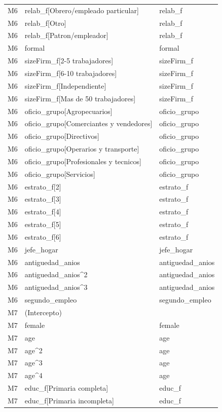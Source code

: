 \begin{longtable}{lll}
M6 & relab\_f[Obrero/empleado particular] & relab\_f \\
M6 & relab\_f[Otro] & relab\_f \\
M6 & relab\_f[Patron/empleador] & relab\_f \\
M6 & formal & formal \\
M6 & sizeFirm\_f[2-5 trabajadores] & sizeFirm\_f \\
M6 & sizeFirm\_f[6-10 trabajadores] & sizeFirm\_f \\
M6 & sizeFirm\_f[Independiente] & sizeFirm\_f \\
M6 & sizeFirm\_f[Mas de 50 trabajadores] & sizeFirm\_f \\
M6 & oficio\_grupo[Agropecuarios] & oficio\_grupo \\
M6 & oficio\_grupo[Comerciantes y vendedores] & oficio\_grupo \\
M6 & oficio\_grupo[Directivos] & oficio\_grupo \\
M6 & oficio\_grupo[Operarios y transporte] & oficio\_grupo \\
M6 & oficio\_grupo[Profesionales y tecnicos] & oficio\_grupo \\
M6 & oficio\_grupo[Servicios] & oficio\_grupo \\
M6 & estrato\_f[2] & estrato\_f \\
M6 & estrato\_f[3] & estrato\_f \\
M6 & estrato\_f[4] & estrato\_f \\
M6 & estrato\_f[5] & estrato\_f \\
M6 & estrato\_f[6] & estrato\_f \\
M6 & jefe\_hogar & jefe\_hogar \\
M6 & antiguedad\_anios & antiguedad\_anios \\
M6 & antiguedad\_anios\textasciicircum 2 & antiguedad\_anios \\
M6 & antiguedad\_anios\textasciicircum 3 & antiguedad\_anios \\
M6 & segundo\_empleo & segundo\_empleo \\
M7 & (Intercepto) &  \\
M7 & female & female \\
M7 & age & age \\
M7 & age\textasciicircum 2 & age \\
M7 & age\textasciicircum 3 & age \\
M7 & age\textasciicircum 4 & age \\
M7 & educ\_f[Primaria completa] & educ\_f \\
M7 & educ\_f[Primaria incompleta] & educ\_f \\

\end{longtable}
